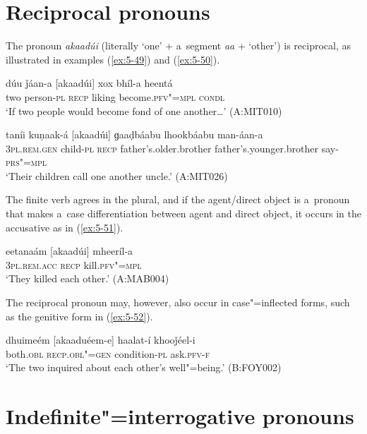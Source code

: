 \section{Reciprocal pronouns}
\label{sec:5-6}

The pronoun \textit{akaadúi} (literally `one' + a~segment \textit{aa} + `other') is reciprocal,
as illustrated in examples (\ref{ex:5-49}) and (\ref{ex:5-50}).

\begin{exe}
\ex
\label{ex:5-49}
\gll dúu ǰáan-a [akaadúi] xox bhíl-a heentá\\
two person-\textsc{pl} \textsc{recp} liking become.\textsc{pfv"=mpl} \textsc{condl}\\
\glt `If two people would become fond of one another{\ldots}' (A:MIT010)

\ex
\label{ex:5-50}
\gll taníi kuṇaak-á [akaadúi] ɡaaḍbáabu lhookbáabu man-áan-a\\
\textsc{3pl.rem.gen} child-\textsc{pl} \textsc{recp} father's.older.brother father's.younger.brother say-\textsc{prs"=mpl} \\
\glt `Their children call one another uncle.' (A:MIT026)
\end{exe}

The finite verb agrees in the plural, and if the agent/direct object is a~pronoun that makes a~case differentiation between agent and direct object, it occurs in the accusative as in (\ref{ex:5-51}).
\begin{exe}
\ex
\label{ex:5-51}
\gll eetanaám [akaadúi] mheeríl-a\\
\textsc{3pl.rem.acc} \textsc{recp } kill.\textsc{pfv"=mpl}\\
\glt `They killed each other.' (A:MAB004)
\end{exe}

The reciprocal pronoun may, however, also occur in case"=inflected forms, such as the genitive form in (\ref{ex:5-52}). 
\begin{exe}
\ex
\label{ex:5-52}
\gll dhuimeém [akaaduéem-e] haalat-í khooǰéel-i\\
both.\textsc{obl} \textsc{recp.obl"=gen } condition-\textsc{pl} ask.\textsc{pfv-f}\\
\glt `The two inquired about each other's well"=being.' (B:FOY002)
\end{exe}

\section{Indefinite"=interrogative pronouns}
\label{sec:5-7}


